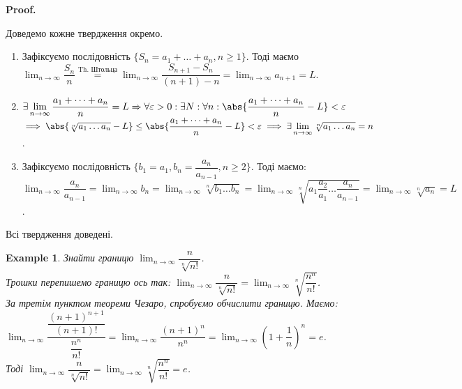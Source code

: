 \documentclass[a4paper, 14pt]{article}
\makeatletter
\def\qed{$\blacksquare$}
\theoremstyle{theoremdd}
\theoremstyle{theoremdd}
\theoremstyle{theoremdd}
\theoremstyle{theoremdd}
\newtheorem{example}[theorem]{Example}
\theoremstyle{theoremdd}
\theoremstyle{theoremdd}
\theoremstyle{theoremdd}
\theoremstyle{theoremdd}
\renewenvironment{proof}[1][Proof.\\]{\par
\pushQED{\hfill \qed}%
\normalfont \topsep6\p@\@plus6\p@\relax
\trivlist
\item\relax
{\bfseries
#1\@addpunct{.}}\hspace\labelsep\ignorespaces
}{%
\popQED\endtrivlist\@endpefalse
}
\makeatother
\begin{document}
	\begin{proof}
	Доведемо кожне твердження окремо.
	\begin{enumerate}[wide=0pt,label={\arabic*)}]
	\item Зафіксуємо послідовність $\{S_n = a_1 + \dots + a_n, n \geq 1\}$. Тоді маємо $\displaystyle \lim_{n \to \infty} \dfrac{S_n}{n} \overset{\text{Th. Штольца}}{=} \lim_{n \to \infty} \dfrac{S_{n+1} - S_n}{(n+1) - n} = \lim_{n \to \infty} a_{n+1} = L$.
	
	\item $\exists \displaystyle \lim_{n \to \infty} \dfrac{a_1+\dots+a_n}{n} = L \Rightarrow \forall \varepsilon > 0: \exists N: \forall n: \abs{\dfrac{a_1+\dots+a_n}{n} - L} < \varepsilon$
	$\implies \abs{\sqrt[n]{a_1 \dots a_n} - L} \leq \abs{\dfrac{a_1+\dots+a_n}{n} - L} < \varepsilon \implies \exists \displaystyle \lim_{n \to \infty} \sqrt[n]{a_1 \dots a_n} = n$.
	
	\item Зафіксуємо послідовність $\{b_1 = a_1, b_n = \dfrac{a_{n}}{a_{n-1}}, n \geq 2\}$. Тоді маємо:\\
	$\displaystyle \lim_{n \to \infty} \dfrac{a_{n}}{a_{n-1}} = \lim_{n \to \infty} b_n = \lim_{n \to \infty} \sqrt[n]{b_1 \dots b_n} = \lim_{n \to \infty} \sqrt[n]{a_1 \dfrac{a_2}{a_1} \dots \dfrac{a_n}{a_{n-1}}} = \lim_{n \to \infty} \sqrt[n]{a_n} = L$.
	\end{enumerate}
	Всі твердження доведені.
	\end{proof}
	
	\begin{example}
	Знайти границю $\displaystyle \lim_{n \to \infty} \dfrac{n}{\sqrt[n]{n!}}$.\\
	Трошки перепишемо границю ось так: $\displaystyle \lim_{n \to \infty} \dfrac{n}{\sqrt[n]{n!}} = \lim_{n \to \infty} \sqrt[n]{\dfrac{n^n}{n!}}$.\\
	За третім пунктом теореми Чезаро, спробуємо обчислити границю. Маємо:\\
	$\displaystyle \lim_{n \to \infty} \dfrac{\dfrac{(n+1)^{n+1}}{(n+1)!}}{\dfrac{n^n}{n!}} = \lim_{n \to \infty} \dfrac{(n+1)^n}{n^n} = \lim_{n \to \infty} \left(1 + \dfrac{1}{n} \right)^n = e$.\\
	Тоді $\displaystyle \lim_{n \to \infty} \dfrac{n}{\sqrt[n]{n!}} = \lim_{n \to \infty} \sqrt[n]{\dfrac{n^n}{n!}} = e$.
	\end{example}
	
	
	\newpage
	
\setcounter{section}{0}	
\end{document}
